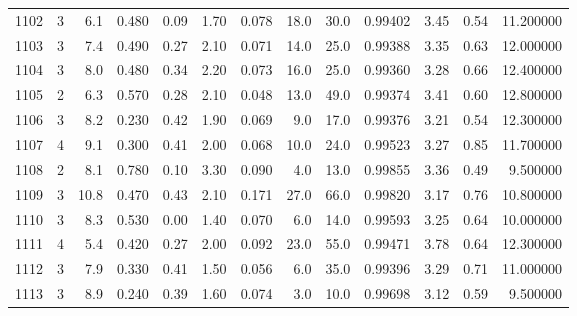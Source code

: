 \begin{tabular}{lrrrrrrrrrrrr}
1102 &        3 &            6.1 &             0.480 &         0.09 &            1.70 &      0.078 &                 18.0 &                  30.0 &  0.99402 &  3.45 &       0.54 &  11.200000 \\
1103 &        3 &            7.4 &             0.490 &         0.27 &            2.10 &      0.071 &                 14.0 &                  25.0 &  0.99388 &  3.35 &       0.63 &  12.000000 \\
1104 &        3 &            8.0 &             0.480 &         0.34 &            2.20 &      0.073 &                 16.0 &                  25.0 &  0.99360 &  3.28 &       0.66 &  12.400000 \\
1105 &        2 &            6.3 &             0.570 &         0.28 &            2.10 &      0.048 &                 13.0 &                  49.0 &  0.99374 &  3.41 &       0.60 &  12.800000 \\
1106 &        3 &            8.2 &             0.230 &         0.42 &            1.90 &      0.069 &                  9.0 &                  17.0 &  0.99376 &  3.21 &       0.54 &  12.300000 \\
1107 &        4 &            9.1 &             0.300 &         0.41 &            2.00 &      0.068 &                 10.0 &                  24.0 &  0.99523 &  3.27 &       0.85 &  11.700000 \\
1108 &        2 &            8.1 &             0.780 &         0.10 &            3.30 &      0.090 &                  4.0 &                  13.0 &  0.99855 &  3.36 &       0.49 &   9.500000 \\
1109 &        3 &           10.8 &             0.470 &         0.43 &            2.10 &      0.171 &                 27.0 &                  66.0 &  0.99820 &  3.17 &       0.76 &  10.800000 \\
1110 &        3 &            8.3 &             0.530 &         0.00 &            1.40 &      0.070 &                  6.0 &                  14.0 &  0.99593 &  3.25 &       0.64 &  10.000000 \\
1111 &        4 &            5.4 &             0.420 &         0.27 &            2.00 &      0.092 &                 23.0 &                  55.0 &  0.99471 &  3.78 &       0.64 &  12.300000 \\
1112 &        3 &            7.9 &             0.330 &         0.41 &            1.50 &      0.056 &                  6.0 &                  35.0 &  0.99396 &  3.29 &       0.71 &  11.000000 \\
1113 &        3 &            8.9 &             0.240 &         0.39 &            1.60 &      0.074 &                  3.0 &                  10.0 &  0.99698 &  3.12 &       0.59 &   9.500000 \\

\end{tabular}
